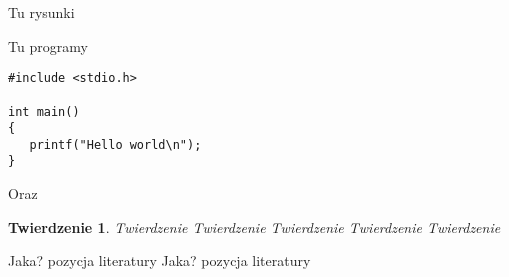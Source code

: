 \documentclass[twoside]{projektInzynierskiMS}
\newtheorem{tw}{Twierdzenie}%
\begin{document}
Tu rysunki


Tu programy

\begin{verbatim}
#include <stdio.h>

int main()
{
   printf("Hello world\n");
}
\end{verbatim}

\noindent
Oraz 

\bigskip

\vrule\hspace{10pt}\begin{minipage}{10cm}
\end{minipage}

\begin{tw}
Twierdzenie Twierdzenie Twierdzenie Twierdzenie Twierdzenie 
\end{tw}
\begin{thebibliography}{12}

 Jaka? pozycja literatury
 Jaka? pozycja literatury

\end{thebibliography}
\end{document}
